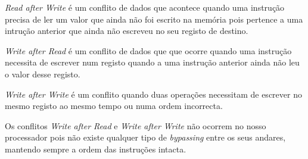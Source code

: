 \textit{Read after Write} é um conflito de dados que acontece quando uma instrução precisa de ler um valor que ainda não foi escrito na memória pois pertence a uma intrução anterior que ainda não escreveu no seu registo de destino.

\textit{Write after Read} é um conflito de dados que que ocorre quando uma instrução necessita de escrever num registo quando a uma instrução anterior ainda não leu o valor desse registo.

\textit{Write after Write} é um conflito quando duas operações necessitam de escrever no mesmo registo ao mesmo tempo ou numa ordem incorrecta.

Os conflitos \textit{Write after Read} e \textit{Write after Write} não ocorrem no nosso processador pois não existe qualquer tipo de \textit{bypassing} entre os seus andares, mantendo sempre a ordem das instruções intacta. 
